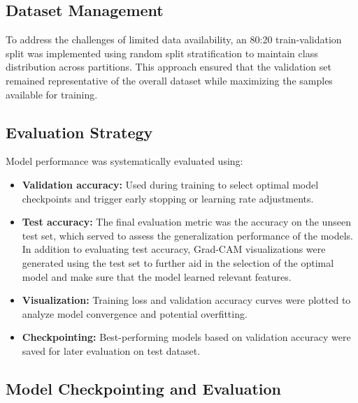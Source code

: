 \documentclass[a4paper,12pt]{report}
\begin{document}
\subsection{Dataset Management}

To address the challenges of limited data availability, an 80:20 train-validation split was implemented using random split stratification to maintain class distribution across partitions. This approach ensured that the validation set remained representative of the overall dataset while maximizing the samples available for training. 


\subsection{Evaluation Strategy}

Model performance was systematically evaluated using:

\begin{itemize}
    \item \textbf{Validation accuracy:} Used during training to select optimal model checkpoints and trigger early stopping or learning rate adjustments.
    \item \textbf{Test accuracy:} The final evaluation metric was the accuracy on the unseen test set, which served to assess the generalization performance of the models. In addition to evaluating test accuracy, Grad-CAM visualizations were generated using the test set to further aid in the selection of the optimal model and make sure that the model learned relevant features.
    \item \textbf{Visualization:} Training loss and validation accuracy curves were plotted to analyze model convergence and potential overfitting.
    \item \textbf{Checkpointing:} Best-performing models based on validation accuracy were saved for later evaluation on test dataset.
\end{itemize}

\subsection{Model Checkpointing and Evaluation}
\end{document}
